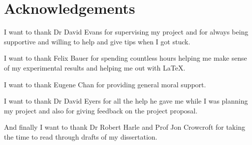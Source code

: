 \chapter{Acknowledgements}
I want to thank Dr David Evans for supervising my project and for always being supportive and willing to help and give tips when I got stuck.

I want to thank Felix Bauer for spending countless hours helping me make sense of my experimental results and helping me out with \LaTeX.

I want to thank Eugene Chan for providing general moral support.

I want to thank Dr David Eyers for all the help he gave me while I was planning my project and also for giving feedback on the project proposal.

And finally I want to thank Dr Robert Harle and Prof Jon Crowcroft for taking the time to read through drafts of my dissertation.
